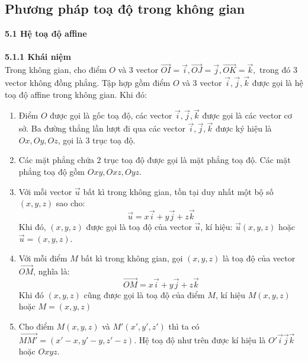 \documentclass[12pt,a4]{article}
\begin{document}
\begin{titlepage}
\section{Phương pháp toạ độ trong không gian}
\vspace{0.2cm}
\textbf{5.1 Hệ toạ độ affine}\\
\vspace{0.2cm}\\
\textbf{5.1.1 Khái niệm}\\
Trong không gian, cho điểm $O$ và 3 vector $\overrightarrow{OI} = \vec{i}, \overrightarrow{OJ} = \vec{j}, \overrightarrow{OK} = \vec{k},$ trong đó 3 vector không đồng phẳng. Tập hợp gồm điểm $O$ và 3 vector $\vec{i},\vec{j},\vec{k}$ được gọi là hệ toạ độ affine trong không gian. Khi đó:
\begin{enumerate}
    \item Điểm $O$ được gọi là gốc toạ độ, các vector $\vec{i},\vec{j},\vec{k}$ được gọi là các vector cơ sở. Ba đường thẳng lần lượt đi qua các vector $\vec{i},\vec{j},\vec{k}$ được ký hiệu là $Ox, Oy, Oz$, gọi là 3 trục toạ độ.
    \item Các mặt phẳng chứa 2 trục toạ độ được gọi là mặt phẳng toạ độ. Các mặt phẳng toạ độ gồm $Oxy, Oxz, Oyz$.
    \item Với mỗi vector $\vec{u}$ bất kì trong không gian, tồn tại duy nhất một bộ số $(x,y,z)$ sao cho:
    \[
    \vec{u} = x \vec{i} + y \vec{j} + z \vec{k}
    \]
    Khi đó, $(x,y,z)$ được gọi là toạ độ của vector $\vec{u}$, kí hiệu: $\vec{u}(x,y,z)$ hoặc $\vec{u} = (x,y,z).$
    \item Với mỗi điểm $M$ bất kì trong không gian, gọi $(x,y,z)$ là toạ độ của vector $\overrightarrow{OM}$, nghĩa là:
    \[
    \overrightarrow{OM} = x \vec{i} + y\vec{j} + z\vec{k}
    \]
    Khi đó $(x,y,z)$ cũng được gọi là toạ độ của điểm $M$, kí hiệu $M(x,y,z)$ hoặc $M = (x,y,z)$
    \item Cho điểm $M(x,y,z)$ và $M'(x',y',z')$ thì ta có $\overrightarrow{MM'} = (x' - x, y' - y, z' - z).$
    Hệ toạ độ như trên được kí hiệu là $O' \vec{i} \vec{j} \vec{k}$ hoặc $Oxyz$.\\
    \begin{center}
\end{center}
\end{enumerate}
\end{titlepage}
\end{document}
